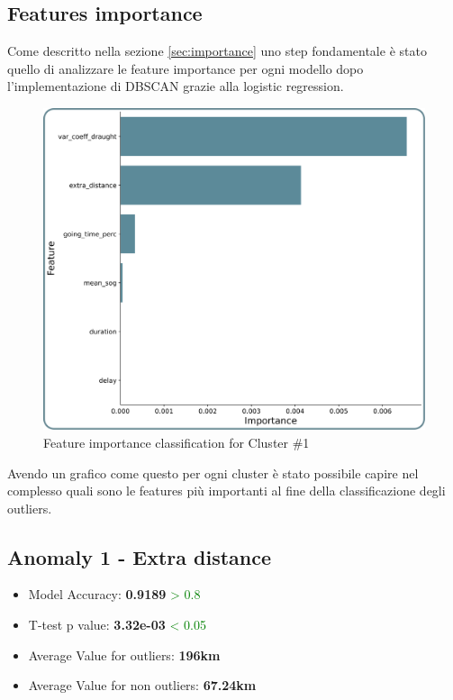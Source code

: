 \subsection{Features importance}
\label{sec:testing-importance}

Come descritto nella sezione \ref{sec:importance} uno step fondamentale è stato quello di analizzare le feature importance per ogni modello dopo l'implementazione di DBSCAN grazie alla logistic regression.

\begin{figure}[H]
    \centering
    \includegraphics[width=13cm]{Images/3/importance.png}
    \caption{Feature importance classification for Cluster \#1}
\end{figure}

Avendo un grafico come questo per ogni cluster è stato possibile capire nel complesso quali sono le features più importanti al fine della classificazione degli outliers.

\clearpage
\subsection{Anomaly 1 - Extra distance}
\label{sec:anomaly-1}

\begin{itemize}
\item Model Accuracy: \textbf{0.9189} \textcolor{green}{> 0.8}
\item T-test p value: \textbf{3.32e-03} \textcolor{green}{< 0.05}
\item Average Value for outliers: \textbf{196km}
\item Average Value for non outliers: \textbf{67.24km}
\end{itemize}

